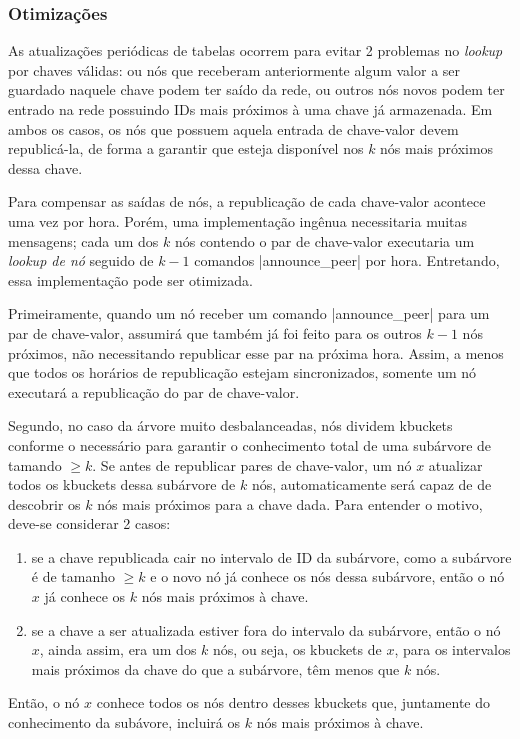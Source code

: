 
\subsubsection*{Otimizações}

As atualizações periódicas de tabelas ocorrem para evitar 2 problemas no \emph{lookup}
por chaves válidas: ou nós que receberam anteriormente algum valor a ser guardado
naquele chave podem ter saído da rede, ou outros nós novos podem ter entrado na rede
possuindo IDs mais próximos à uma chave já armazenada. Em ambos os casos, os nós que
possuem aquela entrada de chave-valor devem republicá-la, de forma a garantir que esteja
disponível nos $k$ nós mais próximos dessa chave.

Para compensar as saídas de nós, a republicação de cada chave-valor acontece uma vez por
hora. Porém, uma implementação ingênua necessitaria muitas mensagens; cada um dos $k$
nós contendo o par de chave-valor executaria um \emph{lookup de nó} seguido de $k - 1$
comandos \bverb|announce_peer| por hora. Entretando, essa implementação pode ser
otimizada.

Primeiramente, quando um nó receber um comando \bverb|announce_peer| para um par de
chave-valor, assumirá que também já foi feito para os outros $k - 1$ nós próximos, não
necessitando republicar esse par na próxima hora. Assim, a menos que todos os horários
de republicação estejam sincronizados, somente um nó executará a republicação do par de
chave-valor.

Segundo, no caso da árvore muito desbalanceadas, nós dividem \glspl*{kbucket} conforme
o necessário para garantir o conhecimento total de uma subárvore de tamando $\geq k$. Se
antes de republicar pares de chave-valor, um nó $x$ atualizar todos os \glspl*{kbucket}
dessa subárvore de $k$ nós, automaticamente será capaz de de descobrir os $k$ nós
mais próximos para a chave dada. Para entender o motivo, deve-se considerar 2 casos:

\begin{enumerate}
    \item se a chave republicada cair no intervalo de ID da subárvore, como a subárvore
        é de tamanho $\geq k$ e o novo nó já conhece os nós dessa subárvore, então o nó
        $x$ já conhece os $k$ nós mais próximos à chave.

    \item se a chave a ser atualizada estiver fora do intervalo da subárvore, então o
        nó $x$, ainda assim, era um dos $k$ nós, ou seja, os \glspl*{kbucket} de $x$,
        para os intervalos mais próximos da chave do que a subárvore, têm menos que $k$
        nós.
\end{enumerate}

Então, o nó $x$ conhece todos os nós dentro desses \glspl*{kbucket} que, juntamente do
conhecimento da subávore, incluirá os $k$ nós mais próximos à chave.
